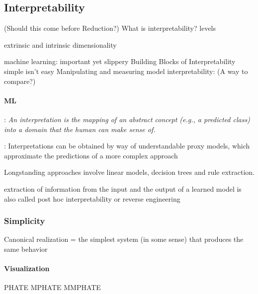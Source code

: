 \documentclass{article}
\newcommand{\ascomment}[1]{\textcolor{ascolor}{(#1)}}
\theoremstyle{definition} \newtheorem{definition}{Definition}  \newtheorem{example}{Example}
\theoremstyle{remark} \newtheorem{remark}{Remark}
\newcounter{ct}
\begin{document}
\subsection{Interpretability}
\ascomment{Should this come before Reduction?}
What is interpretability? \citep{erasmus2021interpretability}
\citep{madsen2024interpretability}
levels \citep{hochstein2022levels}

\citep{whiteway2019interpretable}
\citep{kar2022interpretability}
extrinsic and intrinsic dimensionality\citep{jazayeri2021interpreting}

 machine learning: important yet slippery\citep{lipton2018mythos}	
 Building Blocks of Interpretability \citep{olah2018interpretability}
\citep{beisbart2022interpretability}
simple isn't easy \citep{raz2024ml}
Manipulating and measuring model interpretability\citep{poursabzi2021manipulating}: \ascomment{A way to compare?}
\citep{he2024multilevel}

\paragraph{ML}
\citep{montavon2018methods}: \emph{An interpretation is the mapping of an abstract concept (e.g., a predicted class) into a domain that the human can make sense of.}

\citep{ehrhardt2017learning, guidotti2018survey}: Interpretations can be obtained by way of understandable proxy models, which approximate the predictions of a more complex approach

Longstanding approaches involve linear models, decision trees and rule extraction.

extraction of information from the input and the output of a learned model is also called post hoc interpretability or reverse engineering


\subsubsection{Simplicity}
\citep{gao2015simplicity}
\citep{dyer2023simplest}
\citep{quinn2022information}%
%
Canonical realization = the simplest system (in some sense) that produces the same behavior


\paragraph{Visualization}
\citep{deregt2017understanding}
\citep{karpathy2015visualizing}
PHATE \citep{moon2017visualizing}
MPHATE\citep{gigante2019visualizing}
MMPHATE\citep{xie2024multiway} 
\citep{madsen2019visualizing}
\end{document}
